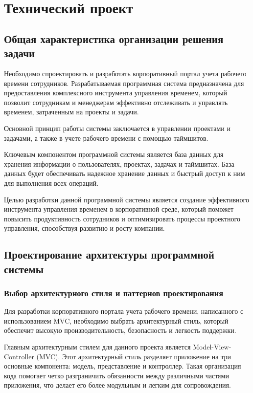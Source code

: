 \section{Технический проект}
\subsection{Общая характеристика организации решения задачи}

Необходимо спроектировать и разработать корпоративный портал учета рабочего времени сотрудников. Разрабатываемая программная система предназначена для предоставления комплексного инструмента управления временем, который позволит сотрудникам и менеджерам эффективно отслеживать и управлять временем, затраченным на проекты и задачи.

Основной принцип работы системы заключается в управлении проектами и задачами, а также в учете рабочего времени с помощью таймшитов.

Ключевым компонентом программной системы является база данных для хранения информации о пользователях, проектах, задачах и таймшитах. База данных будет обеспечивать надежное хранение данных и быстрый доступ к ним для выполнения всех операций.

Целью разработки данной программной системы является создание эффективного инструмента управления временем в корпоративной среде, который поможет повысить продуктивность сотрудников и оптимизировать процессы проектного управления, способствуя развитию и росту компании.

\subsection{Проектирование архитектуры программной системы}
\subsubsection{Выбор архитектурного стиля и паттернов проектирования}

Для разработки корпоративного портала учета рабочего времени, написанного с использованием MVC, необходимо выбрать архитектурный стиль, который обеспечит высокую производительность, безопасность и легкость поддержки.

Главным архитектурным стилем для данного проекта является Model-View-Controller (MVC). Этот архитектурный стиль разделяет приложение на три основные компонента: модель, представление и контроллер. Такая организация кода помогает четко разграничить обязанности между различными частями приложения, что делает его более модульным и легким для сопровождения.

